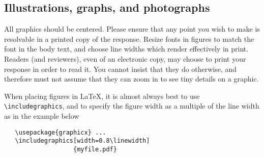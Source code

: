 \documentclass[10pt,twocolumn,letterpaper]{article}
\begin{document}
\subsection{Illustrations, graphs, and photographs}

All graphics should be centered.
Please ensure that any point you wish to make is resolvable in a printed copy of the response.
Resize fonts in figures to match the font in the body text, and choose line widths which render effectively in print.
Readers (and reviewers), even of an electronic copy, may choose to print your response in order to read it.
You cannot insist that they do otherwise, and therefore must not assume that they can zoom in to see tiny details on a graphic.

When placing figures in \LaTeX, it is almost always best to use \verb+\includegraphics+, and to specify the  figure width as a multiple of the line width as in the example below
{\small\begin{verbatim}
   \usepackage{graphicx} ...
   \includegraphics[width=0.8\linewidth]
                   {myfile.pdf}
\end{verbatim}
}


{\small
}
\end{document}
